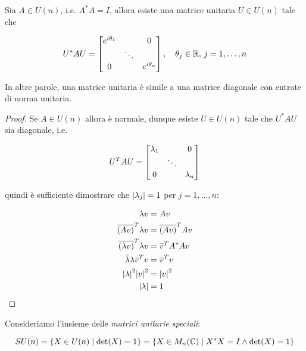 \begin{corollary}[3]
	Sia $ A \in U(n) $, i.e. $ A^{*} A = I $, allora esiste una matrice unitaria $ U \in U(n) $ tale che
	
	\begin{equation}
		U^{*} A U = %
		\bmqty{ %
				\dmat{ %
						e^{i \theta_{1}} & & 0 \\
						& \ddots & \\
						0 & & e^{i \theta_{n}} %
						}
				} %
		\qcomma \theta_{j} \in \R, \, j=1,\dots,n
	\end{equation}

	In altre parole, una matrice unitaria è simile a una matrice diagonale con entrate di norma unitaria.
\end{corollary}

\begin{proof}
	Se $ A \in U(n) $ allora è normale, dunque esiste $ U \in U(n) $ tale che $ U^{*} A U $ sia diagonale, i.e.
	
	\begin{equation}
		U^{T} A U = %
		\bmqty{ %
				\dmat{ %
						\lambda_{1} & & 0 \\
						& \ddots & \\
						0 & & \lambda_{n} %
						}
				}
	\end{equation}

	quindi è sufficiente dimostrare che $ \abs{\lambda_{j}} = 1 $ per $ j=1,\dots,n $:
	
	\begin{align}
		\begin{split}
			\lambda v &= A v \\
			\overline{(A v)}^{T} \lambda v &= \overline{(A v)}^{T} A v \\
			\overline{(\lambda v)}^{T} \lambda v &= \bar{v}^{T} A^{*} A v \\
			\bar{\lambda} \lambda \bar{v}^{T} v &= \bar{v}^{T} v \\
			\abs{\lambda}^{2} \abs{v}^{2} &= \abs{v}^{2} \\
			\abs{\lambda} &= 1
		\end{split}
	\end{align}
\end{proof}

Consideriamo l'insieme delle \textit{matrici unitarie speciali}:

\begin{equation}
	SU(n) = \{ X \in U(n) \mid \det(X) = 1 \} %
	= \{ X \in M_{n}(\C) \mid X^{*} X = I \wedge \det(X) = 1 \}
\end{equation}

